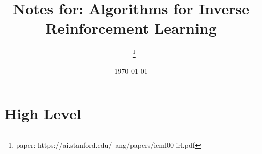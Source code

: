 \documentclass{article}
\title{Notes for: Algorithms for Inverse Reinforcement Learning}
\author{-- \thanks{paper: https://ai.stanford.edu/~ang/papers/icml00-irl.pdf}}
\date{\today}
\begin{document}
    \maketitle
    
    \section{High Level}
\end{document}
